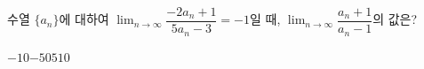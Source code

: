 수열 $\{a_n\}$에 대하여 $\displaystyle\lim_{n\to\infty}\dfrac{-2a_n+1}{5a_n-3}=-1$일 때, $\displaystyle\lim_{n\to\infty}\dfrac{a_n+1}{a_n-1}$의 값은?
\begin{choices32}{$-10$}{$-5$}{$0$}{$5$}{$10$}\end{choices32}
